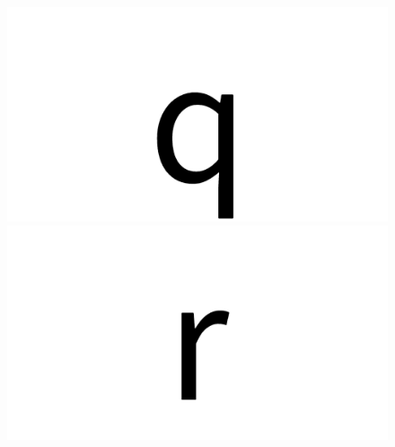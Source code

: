 \documentclass{article}
\begin{document}
\begin{figure}[H]
  \includegraphics[width=\linewidth]{q}
\endminipage\hfill
{}
  \includegraphics[width=\linewidth]{r}
\endminipage\hfill
\end{figure}
\end{document}

